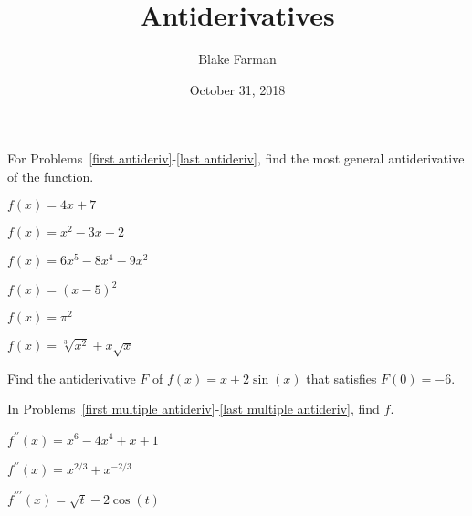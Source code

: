 \documentclass[10pt]{amsart}
\title{Antiderivatives}
\date{October 31, 2018}
\author{Blake Farman}
\begin{document}
\maketitle

\makenameslot

For Problems~\eqref{first antideriv}-\eqref{last antideriv}, find the most general antiderivative of the function.
\begin{multicols}{3}
\begin{thm}\label{first antideriv}
  \(f(x) = 4x + 7\)
\end{thm}

\begin{thm}
  \(f(x) = x^2 - 3x + 2\)
\end{thm}

\begin{thm}
  \(f(x) = 6x^5 - 8x^4 - 9x^2\)
\end{thm}
\end{multicols}

\vspace{2in}

\begin{multicols}{3}
  \begin{thm}
    \(f(x) = (x - 5)^2\)
  \end{thm}

  \begin{thm}
    \(f(x) = \pi^2\)
  \end{thm}

  \begin{thm}\label{last antideriv}
    \(f(x) = \sqrt[3]{x^2} + x\sqrt{x}\)
  \end{thm}
\end{multicols}

\newpage

\begin{thm}
  Find the antiderivative \(F\) of \(f(x) = x + 2\sin(x)\) that satisfies \(F(0) = -6\).
\end{thm}

\vspace{3in}

In Problems~\eqref{first multiple antideriv}-\eqref{last multiple antideriv}, find \(f\).
\begin{multicols}{3}
  \begin{thm}\label{first multiple antideriv}
    \(f^{\prime\prime}(x) = x^6 - 4x^4 + x + 1\)
  \end{thm}

  \begin{thm}
    \(f^{\prime\prime}(x) = x^{2/3} + x^{-2/3}\)
  \end{thm}

  \begin{thm}\label{last multiple antideriv}
    \(f^{\prime\prime\prime}(x) = \sqrt{t} - 2\cos(t)\)
  \end{thm}
\end{multicols}
\end{document}
